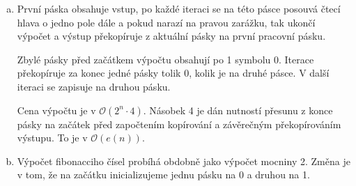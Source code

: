 \documentclass[a4paper]{article}
\begin{document}
\begin{enumerate}[(a)]
    \item První páska obsahuje vstup, po každé iteraci se na této pásce posouvá čtecí hlava o jedno pole dále a pokud narazí na pravou zarážku, tak ukončí výpočet a výstup překopíruje z aktuální pásky na první pracovní pásku.

    Zbylé pásky před začátkem výpočtu obsahují po 1 symbolu 0. Iterace překopíruje za konec jedné pásky tolik 0, kolik je na druhé pásce. V další iteraci se zapisuje na druhou pásku.

    Cena výpočtu je v $\mathcal{O}(2^{n} \cdot 4)$. Násobek 4 je dán nutností přesunu z konce pásky na začátek před započtením kopírování a závěrečným překopírováním výstupu. To je v $\mathcal{O}(e(n))$.

    \item Výpočet fibonacciho čísel probíhá obdobně jako výpočet mocniny 2. Změna je v tom, že na začátku inicializujeme jednu pásku na 0 a druhou na 1.
\end{enumerate}
\end{document}
